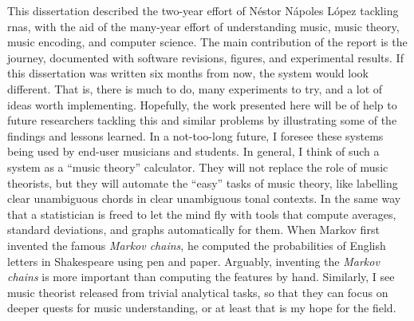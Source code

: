 
This dissertation described the two-year effort of N\'estor
N\'apoles L\'opez tackling \glspl{rna}, with the aid of the
many-year effort of understanding music, music theory, music
encoding, and computer science. The main contribution of the
report is the journey, documented with software revisions,
figures, and experimental results. If this dissertation was
written six months from now, the system would look
different. That is, there is much to do, many experiments to
try, and a lot of ideas worth implementing. Hopefully, the
work presented here will be of help to future researchers
tackling this and similar problems by illustrating some of
the findings and lessons learned. In a not-too-long future,
I foresee these systems being used by end-user musicians and
students. In general, I think of such a system as a ``music
theory'' calculator. They will not replace the role of music
theorists, but they will automate the ``easy'' tasks of
music theory, like labelling clear unambiguous chords in
clear unambiguous tonal contexts. In the same way that a
statistician is freed to let the mind fly with tools that
compute averages, standard deviations, and graphs
automatically for them. When Markov first invented the
famous \emph{Markov chains}, he computed the probabilities
of English letters in Shakespeare using pen and paper.
Arguably, inventing the \emph{Markov chains} is more
important than computing the features by hand. Similarly, I
see  music theorist released from trivial analytical tasks,
so that they can focus on deeper quests for music
understanding, or at least that is my hope for the field. 

